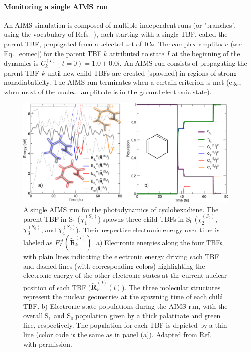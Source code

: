 \documentclass[9pt,bestpractices]{livecoms}
\newcommand{\bs}{\mathbf}
\begin{document}
\paragraph{Monitoring a single AIMS run}

An AIMS simulation is composed of multiple independent runs (or 'branches', using the vocabulary of Refs.~), each starting with a single TBF, called the parent TBF, propagated from a selected set of ICs. The complex amplitude (see Eq.~\eqref{eomec}) for the parent TBF $k$ attributed to state $I$ at the beginning of the dynamics is $C_{k}^{(I)}(t=0)=1.0+0.0i$. An AIMS run consists of propagating the parent TBF $k$ until new child TBFs are created (spawned) in regions of strong nonadiabaticity. The AIMS run terminates when a certain criterion is met (e.g., when most of the nuclear amplitude is in the ground electronic state). 

\begin{figure}[h!]
    \centering
    \includegraphics[width=1.0\linewidth]{./figures/AIMS_runNEW.png}
    \caption{A single AIMS run for the photodynamics of cyclohexadiene. The parent TBF in S$_1$ ($\tilde{\chi}_{1}^{(S_1)}$) spawns three child TBFs in S$_0$ ($\tilde{\chi}_{2}^{(S_0)}$, $\tilde{\chi}_{3}^{(S_0)}$, and $\tilde{\chi}_{4}^{(S_0)}$). Their respective electronic energy over time is labeled as $E_I^{el}(\tilde{\bs R}_k^{(I)})$.  a) Electronic energies along the four TBFs, with plain lines indicating the electronic energy driving each TBF and dashed lines (with corresponding colors) highlighting the electronic energy of the other electronic states at the current nuclear position of each TBF ($\tilde{\bs R}_k^{(I)}(t)$). The three molecular structures represent the nuclear geometries at the spawning time of each child TBF. b) Electronic-state populations during the AIMS run, with the overall S$_1$ and S$_0$ population given by a thick palatinate and green line, respectively. The population for each TBF is depicted by a thin line (color code is the same as in panel (a)). Adapted from Ref.~ with permission.}
    \label{fig:aimsrun}
\end{figure}
\end{document}
